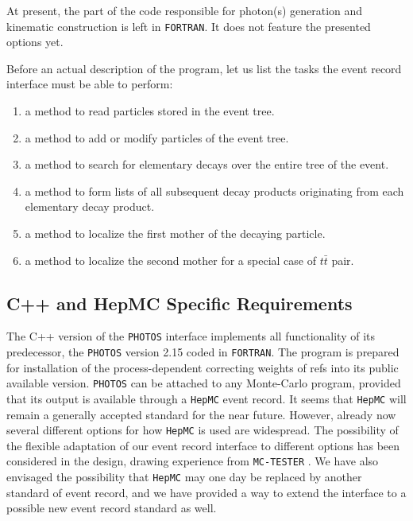 \documentclass[]{Photos_interface_design}
\begin{document}
At present, the part of the code responsible for photon(s) generation and kinematic 
construction is left in  {\tt FORTRAN}. It does not feature the presented options yet.


Before an actual description of the program, let us list the tasks the event record interface must be able to perform:
\begin{enumerate}
\item a method to read  particles stored in the event tree.
\item a method to add or modify particles of the event tree.
\item a method to search for elementary decays over the entire tree of the event.
\item a method to form lists of all subsequent decay products originating from each elementary decay product.
\item a method to localize the first mother of the decaying particle. 
\item a method to localize the second mother for a special case of $t \bar t$ pair.
\end{enumerate}


\subsection{C++ and HepMC Specific Requirements}

The C++ version of the {\tt PHOTOS} interface implements all functionality
of its predecessor, the {\tt PHOTOS} version 2.15 \cite{Golonka:2005pn} coded in {\tt FORTRAN}.
The program is prepared for installation of the process-dependent correcting weights of refs 
\cite{Golonka:2006tw,Nanava:2009vg} into its public available version. 
{\tt PHOTOS} can be attached to any Monte-Carlo program,
provided that its output is available through a {\tt HepMC} \cite{Dobbs:2001ck} event record.
It seems that {\tt HepMC} will
remain a generally accepted standard for the near future. However,
already now several different options for how {\tt HepMC} is used are
widespread. The possibility of the flexible  adaptation of our event record 
interface to different
options has been considered in the design,  drawing experience
from {\tt MC-TESTER} \cite{Golonka:2002rz,Davidson:2008ma}.
We have also
envisaged the possibility that {\tt HepMC} may one day be replaced by another
standard of event record, and we have provided a way to extend
the interface to a possible new event record standard as well.
\end{document}

